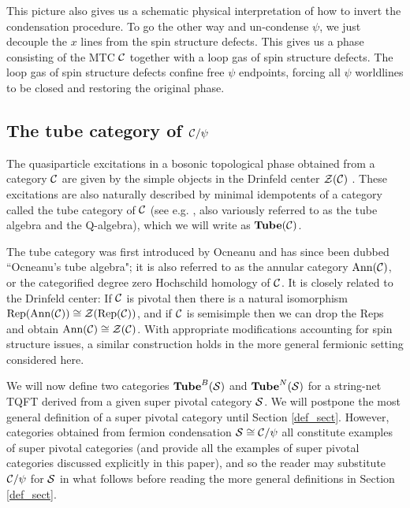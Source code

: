 This picture also gives us a schematic physical interpretation of how to invert the condensation 
procedure. 
To go the other way and un-condense $\psi$, we just decouple the $x$ lines from the spin structure defects.
This gives us a phase consisting of the MTC $\mathcal{C}$ together with a loop gas of spin structure defects.
The loop gas of spin structure defects confine free $\psi$ endpoints, forcing all $\psi$ 
worldlines to be closed and restoring the original phase. 


\subsection{The tube category of $\mathcal{C}/\psi$}

The quasiparticle excitations in a bosonic topological phase obtained from a category $\mathcal{C}$ 
are given by the simple objects in the Drinfeld center $\mathcal{Z}(\mathcal{C})$ \cite{levin2005}.
These excitations are also naturally described by minimal idempotents of a category called the tube category of $\mathcal{C}$ (see e.g. \cite{ocneanu2001,evans1995,Izumi2000,muger2003b,Bultinck2017,Lan2014, Hu2015}, 
also variously referred to as the tube algebra and the Q-algebra), 
which we will write as $\textbf{Tube}(\mathcal{C})$.

The tube category was first introduced by Ocneanu \cite{ocneanu1994} and has since 
been dubbed ``Ocneanu's tube algebra"; it is also referred to as the annular category $\text{Ann}(\mathcal{C})$, 
or the categorified degree zero Hochschild homology of $\mathcal{C}$.
It is closely related to the Drinfeld center:
If $\mathcal{C}$ is pivotal then there is a natural isomorphism
$\text{Rep}(\text{Ann}(\mathcal{C})) \cong \mathcal{Z}(\text{Rep}(\mathcal{C}))$, and if $\mathcal{C}$ is semisimple then we can drop
the $\text{Rep}$s and obtain $\text{Ann}(\mathcal{C}) \cong \mathcal{Z}(\mathcal{C})$.
With appropriate modifications accounting for spin structure issues, a similar construction holds 
in the more general fermionic setting considered here. 


\medskip
We will now define two categories $\textbf{Tube}^B(\mathcal{S})$ and $\textbf{Tube}^N(\mathcal{S})$ for a string-net TQFT derived from a given super pivotal category $\mathcal{S}$. 
We will postpone the most general definition of a super pivotal category until Section \ref{def_sect}. 
However, categories
obtained from fermion condensation $\mathcal{S} \cong \mathcal{C} / \psi$ all constitute examples of super pivotal categories (and provide all the examples of super pivotal categories discussed explicitly in this paper), 
and so the reader may substitute $\mathcal{C}/\psi$ for $\mathcal{S}$ in what follows before reading the more 
general definitions in Section \ref{def_sect}. 

